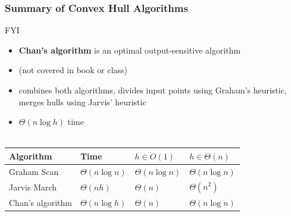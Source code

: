 \documentclass{beamer}
\newcommand{\stanza}{ \\~\ }
\begin{document}
\begin{frame} \frametitle{Summary of Convex Hull Algorithms}
  FYI
  \begin{itemize}
    \item \textbf{Chan's algorithm} is an optimal output-sensitive algorithm
    \item (not covered in book or class)
    \item combines both algorithms, divides input points using Graham's heuristic,
      merges hulls using Jarvis' heuristic
    \item $\Theta(n \log h)$ time \stanza
  \end{itemize}

\begin{center}
  \begin{tabular}{|l|l|l|l|}
    \hline
    \textbf{Algorithm} & \textbf{Time} & $h \in O(1)$ & $h \in \Theta(n)$ \\ \hline
    Graham Scan & $\Theta(n \log n)$ & $\Theta(n \log n)$ & $\Theta(n \log n)$ \\
    Jarvis March & $\Theta(nh)$ & $\Theta(n)$ & $\Theta(n^2)$ \\
    Chan's algorithm & $\Theta(n \log h)$ & $\Theta(n)$ & $\Theta(n \log n)$ \\
    \hline
  \end{tabular}
\end{center}

\end{frame}
\end{document}
